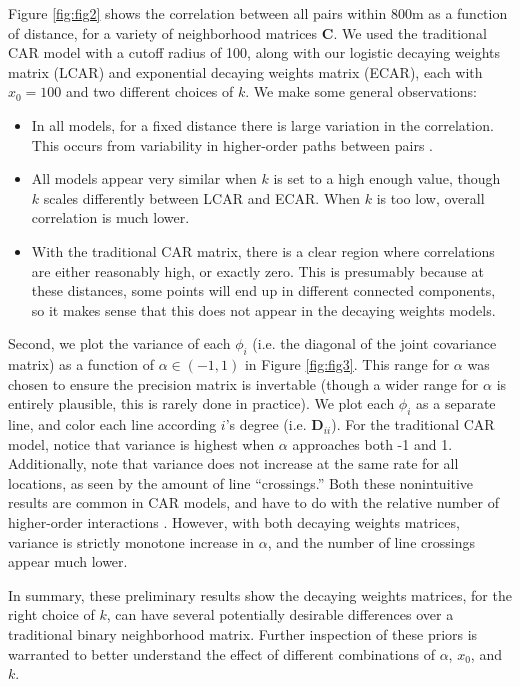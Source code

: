 \documentclass{scrartcl}
\newcommand{\mat}[1]{\bm{#1}}
\begin{document}
Figure \ref{fig:fig2} shows the correlation between all pairs within
800m as a function of distance, for a variety of neighborhood matrices
$\mat{C}$. We used the traditional CAR model with a cutoff radius of
100, along with our logistic decaying weights matrix (LCAR) and
exponential decaying weights matrix (ECAR), each with $x_0 = 100$ and
two different choices of $k$. We make some general observations:

\begin{itemize}
\item In all models, for a fixed distance there is large variation in
  the correlation. This occurs from variability in higher-order paths
  between pairs \cite{Assuncao2009}.
\item All models appear very similar when $k$ is set to a high enough
  value, though $k$ scales differently between LCAR and ECAR. When $k$
  is too low, overall correlation is much lower.
\item With the traditional CAR matrix, there is a clear region where
  correlations are either reasonably high, or exactly zero. This is
  presumably because at these distances, some points will end up in
  different connected components, so it makes sense that this does not
  appear in the decaying weights models.
\end{itemize}

Second, we plot the variance of each $\phi_i$ (i.e. the diagonal of
the joint covariance matrix) as a function of $\alpha\in(-1, 1)$ in
Figure \ref{fig:fig3}. This range for $\alpha$ was chosen to ensure
the precision matrix is invertable (though a wider range for $\alpha$
is entirely plausible, this is rarely done in practice). We plot each
$\phi_i$ as a separate line, and color each line according $i$'s
degree (i.e. $\mat{D}_{ii}$). For the traditional CAR model, notice
that variance is highest when $\alpha$ approaches both -1 and
1. Additionally, note that variance does not increase at the same rate
for all locations, as seen by the amount of line ``crossings.'' Both
these nonintuitive results are common in CAR models, and have to do
with the relative number of higher-order interactions
\cite{Assuncao2009}. However, with both decaying weights matrices,
variance is strictly monotone increase in $\alpha$, and the number of
line crossings appear much lower.

In summary, these preliminary results show the decaying weights
matrices, for the right choice of $k$, can have several potentially
desirable differences over a traditional binary neighborhood
matrix. Further inspection of these priors is warranted to better
understand the effect of different combinations of $\alpha$, $x_0$,
and $k$.
\end{document}
